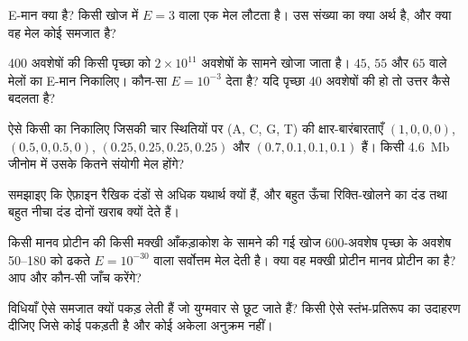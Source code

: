 \begin{exercise}[$\star$]\label{exo:b3:bioinformatics:4}
E-मान क्या है? किसी खोज में $E = 3$ वाला एक मेल लौटता है। उस संख्या का
क्या अर्थ है, और क्या वह मेल कोई समजात है?
\end{exercise}

\begin{exercise}[$\star\star$]\label{exo:b3:bioinformatics:5}
\num{400} अवशेषों की किसी पृच्छा को $2\times 10^{11}$
अवशेषों के सामने खोजा जाता है। $45$, $55$ और $65$  वाले मेलों का
E-मान निकालिए। कौन-सा  $E = 10^{-3}$ देता है? यदि पृच्छा
\num{40} अवशेषों की हो तो उत्तर कैसे बदलता है?
\end{exercise}

\begin{exercise}[$\star\star$]\label{exo:b3:bioinformatics:6}
ऐसे किसी  का  निकालिए जिसकी चार स्थितियों पर (A, C,
G, T) की क्षार-बारंबारताएँ $(1,0,0,0)$, $(0.5,0,0.5,0)$,
$(0.25,0.25,0.25,0.25)$ और $(0.7,0.1,0.1,0.1)$ हैं। किसी \qty{4.6}{Mb}
जीनोम में उसके कितने संयोगी मेल होंगे?
\end{exercise}

\begin{exercise}[$\star\star$]\label{exo:b3:bioinformatics:7}
समझाइए कि ऐफ़ाइन  रैखिक दंडों से अधिक यथार्थ क्यों हैं, और
बहुत ऊँचा रिक्ति-खोलने का दंड तथा बहुत नीचा दंड दोनों खराब 
क्यों देते हैं।
\end{exercise}

\begin{exercise}[$\star\star$]\label{exo:b3:bioinformatics:8}
किसी मानव प्रोटीन की किसी मक्खी आँकड़ाकोश के सामने की गई  खोज
\num{600}-अवशेष पृच्छा के अवशेष 50--180 को ढकते $E = 10^{-30}$ वाला
सर्वोत्तम मेल देती है। क्या वह मक्खी प्रोटीन मानव प्रोटीन का 
है? आप और कौन-सी जाँच करेंगे?
\end{exercise}

\begin{exercise}[$\star\star$]\label{exo:b3:bioinformatics:9}
 विधियाँ ऐसे समजात क्यों पकड़ लेती हैं जो युग्मवार  से
छूट जाते हैं? किसी ऐसे स्तंभ-प्रतिरूप का उदाहरण दीजिए जिसे कोई
 पकड़ती है और कोई अकेला अनुक्रम नहीं।
\end{exercise}

